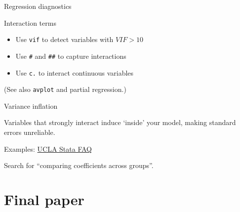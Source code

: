 \documentclass[t]{beamer}
\begin{document}
	\begin{frame}[t]{Regression diagnostics}

		\begin{block}{Interaction terms}

			\begin{itemize}
				\item Use \texttt{vif} to detect variables with $VIF > 10$
				\item Use \texttt{\#} and \texttt{\#\#} to capture interactions
				\item Use \texttt{c.} to interact continuous variables
			\end{itemize}
			
			(See also \texttt{avplot} and partial regression.)
		\end{block}

		\begin{alertblock}{Variance inflation}

			Variables that strongly interact induce  `inside' your model, making standard errors unreliable.

		\end{alertblock}

		\begin{exampleblock}{Examples: \href{http://www.ats.ucla.edu/stat/stata/faq/}{UCLA Stata FAQ}}

			Search for ``comparing coefficients across groups''.

		\end{exampleblock}
					
	\end{frame}


	\section{Final paper}
\end{document}
